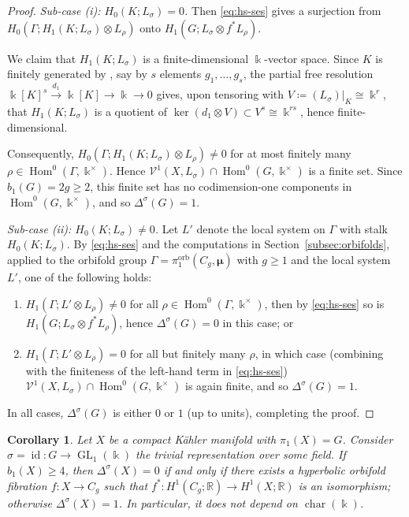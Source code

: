 \documentclass[11pt]{amsart}
\newtheorem{corollary}[theorem]{Corollary}
\theoremstyle{definition}
\newcommand{\R}{\mathbb{R}}
\renewcommand{\k}{\Bbbk}
\newcommand{\VV}{\mathcal{V}}
\DeclareMathOperator{\id}{id}
\DeclareMathOperator{\ch}{char}
\DeclareMathOperator{\GL}{GL}
\DeclareMathOperator{\Hom}{{Hom}}
\DeclareMathOperator{\orb}{orb}
\begin{document}
\begin{proof}
\smallskip
\noindent\textit{Sub-case (i): $H_0(K; L_\sigma)=0$.}
Then \eqref{eq:hs-ses} gives a surjection from
$H_0(\Gamma; H_1(K;L_\sigma)\otimes L_\rho)$
onto $H_1(G; L_\sigma\otimes f^*L_{\rho})$.

We claim that $H_1(K; L_\sigma)$ is a finite-dimensional $\k$-vector space.
Since $K$ is finitely generated by \cite[Lem.~3]{CKO}, say by $s$ elements 
$g_1,\ldots,g_s$, the partial free resolution 
$\k[K]^s \xrightarrow{d_1} \k[K] \to \k \to 0$ gives, upon tensoring with 
$V\coloneqq (L_\sigma)|_K \cong \k^r$, that $H_1(K;L_\sigma)$ is a quotient 
of $\ker(d_1\otimes V)\subset V^s \cong \k^{rs}$, hence finite-dimensional.

Consequently, $H_0(\Gamma; H_1(K;L_\sigma)\otimes L_\rho)\ne 0$ 
for at most finitely many $\rho \in \Hom^0(\Gamma, \k^\times)$.
Hence $\VV^1(X,L_\sigma)\cap \Hom^0(G,\k^{\times})$ is a finite set.
Since $b_1(G) = 2g \ge 2$, this finite set has no codimension-one 
components in $\Hom^0(G,\k^{\times})$, and so $\Delta^\sigma(G) = 1$.

\smallskip
\noindent\textit{Sub-case (ii): $H_0(K; L_\sigma)\ne 0$.}  
Let $L'$ denote the local system on $\Gamma$ with stalk 
$H_0(K; L_\sigma)$. 
By \eqref{eq:hs-ses} and the computations in Section~\ref{subsec:orbifolds}, 
applied to the orbifold group $\Gamma = \pi_1^{\orb}(C_g, \bm{\mu})$ 
with $g\ge 1$ and the local system $L'$, one of the 
following holds:
\begin{enumerate}[label=\textup{(\alph*)},itemsep=2pt]
\item $H_1(\Gamma; L'\otimes L_\rho) \ne 0$ for all 
$\rho \in \Hom^0(\Gamma, \k^\times)$, then by \eqref{eq:hs-ses} so is
$H_1(G; L_\sigma\otimes f^*L_{\rho})$, hence $\Delta^\sigma(G) = 0$ in this case; or
\item $H_1(\Gamma; L'\otimes L_\rho) = 0$ for all but 
finitely many $\rho$, in which case (combining with 
the finiteness of the left-hand term in \eqref{eq:hs-ses})
$\VV^1(X,L_\sigma)\cap \Hom^0(G,\k^{\times})$ is again 
finite, and so $\Delta^\sigma(G) = 1$.
\end{enumerate}

\smallskip\noindent
In all cases, $\Delta^\sigma(G)$ is either $0$ or $1$ 
(up to units), completing the proof.
\end{proof}

\begin{corollary}
\label{cor:Alexander-polynomial}
Let $X$ be a compact K\"ahler manifold with $\pi_1(X)=G$. 
Consider $\sigma=\id\colon G\to \GL_1(\k)$ the trivial representation 
over some field. If $b_1(X)\geq 4$, then
$\Delta^\sigma(X)=0$ if and only if  there exists a 
hyperbolic orbifold fibration $f\colon X \to C_g$ such that 
$f^*\colon H^1(C_g;\R)\to H^1(X;\R)$ is an isomorphism; 
otherwise $\Delta^\sigma(X)=1$.
In particular, it does not depend on $\ch(\k)$.
\end{corollary}
\end{document}
